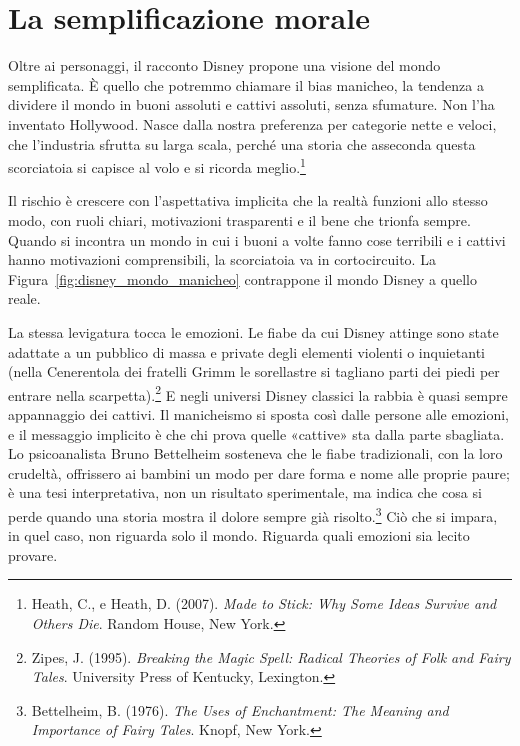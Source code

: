 \section{La semplificazione morale}

Oltre ai personaggi, il racconto Disney propone una visione del mondo semplificata. \`{E} quello che potremmo chiamare il bias manicheo, la tendenza a dividere il mondo in buoni assoluti e cattivi assoluti, senza sfumature. Non l'ha inventato Hollywood. Nasce dalla nostra preferenza per categorie nette e veloci, che l'industria sfrutta su larga scala, perché una storia che asseconda questa scorciatoia si capisce al volo e si ricorda meglio.\footnote{Heath, C., e Heath, D. (2007). \textit{Made to Stick: Why Some Ideas Survive and Others Die}. Random House, New York.}

Il rischio \`{e} crescere con l'aspettativa implicita che la realt\`{a} funzioni allo stesso modo, con ruoli chiari, motivazioni trasparenti e il bene che trionfa sempre. Quando si incontra un mondo in cui i buoni a volte fanno cose terribili e i cattivi hanno motivazioni comprensibili, la scorciatoia va in cortocircuito. La Figura~\ref{fig:disney_mondo_manicheo} contrappone il mondo Disney a quello reale.


La stessa levigatura tocca le emozioni. Le fiabe da cui Disney attinge sono state adattate a un pubblico di massa e private degli elementi violenti o inquietanti (nella Cenerentola dei fratelli Grimm le sorellastre si tagliano parti dei piedi per entrare nella scarpetta).\footnote{Zipes, J. (1995). \textit{Breaking the Magic Spell: Radical Theories of Folk and Fairy Tales}. University Press of Kentucky, Lexington.} E negli universi Disney classici la rabbia è quasi sempre appannaggio dei cattivi. Il manicheismo si sposta così dalle persone alle emozioni, e il messaggio implicito è che chi prova quelle «cattive» sta dalla parte sbagliata. Lo psicoanalista Bruno Bettelheim sosteneva che le fiabe tradizionali, con la loro crudeltà, offrissero ai bambini un modo per dare forma e nome alle proprie paure; è una tesi interpretativa, non un risultato sperimentale, ma indica che cosa si perde quando una storia mostra il dolore sempre già risolto.\footnote{Bettelheim, B. (1976). \textit{The Uses of Enchantment: The Meaning and Importance of Fairy Tales}. Knopf, New York.} Ciò che si impara, in quel caso, non riguarda solo il mondo. Riguarda quali emozioni sia lecito provare.

